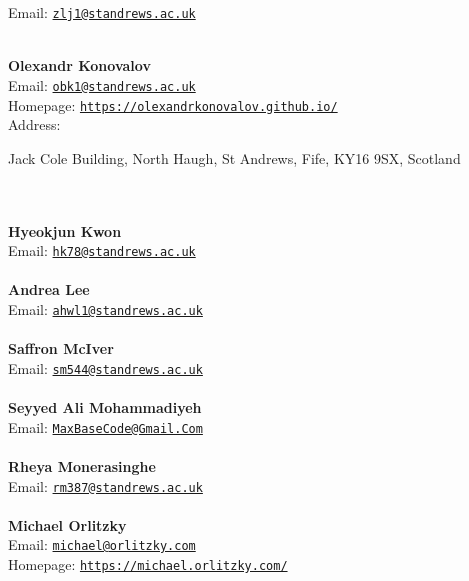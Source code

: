\documentclass[a4paper,11pt]{report}
\begin{document}
\begin{titlepage}
{{  }  Email: \href{mailto://zlj1@st-andrews.ac.uk} {\texttt{zlj1@st\texttt{}andrews.ac.uk}}}\\
{\mbox{}\\
\small \noindent \textbf{ Olexandr Konovalov\\
    }  Email: \href{mailto://obk1@st-andrews.ac.uk} {\texttt{obk1@st\texttt{}andrews.ac.uk}}\\
  Homepage: \href{https://olexandr-konovalov.github.io/} {\texttt{https://olexandr\texttt{}konovalov.github.io/}}\\
  Address: \begin{minipage}[t]{8cm}\noindent
 Jack Cole Building, North Haugh, St Andrews, Fife, KY16 9SX, Scotland\\
 \end{minipage}
}\\
{\mbox{}\\
\small \noindent \textbf{ Hyeokjun Kwon\\
  }  Email: \href{mailto://hk78@st-andrews.ac.uk} {\texttt{hk78@st\texttt{}andrews.ac.uk}}}\\
{\mbox{}\\
\small \noindent \textbf{ Andrea Lee\\
  }  Email: \href{mailto://ahwl1@st-andrews.ac.uk} {\texttt{ahwl1@st\texttt{}andrews.ac.uk}}}\\
{\mbox{}\\
\small \noindent \textbf{ Saffron McIver\\
  }  Email: \href{mailto://sm544@st-andrews.ac.uk} {\texttt{sm544@st\texttt{}andrews.ac.uk}}}\\
{\mbox{}\\
\small \noindent \textbf{ Seyyed Ali Mohammadiyeh\\
  }  Email: \href{mailto://MaxBaseCode@Gmail.Com} {\texttt{MaxBaseCode@Gmail.Com}}}\\
{\mbox{}\\
\small \noindent \textbf{ Rheya Monerasinghe\\
  }  Email: \href{mailto://rm387@st-andrews.ac.uk} {\texttt{rm387@st\texttt{}andrews.ac.uk}}}\\
{\mbox{}\\
\small \noindent \textbf{ Michael Orlitzky\\
   }  Email: \href{mailto://michael@orlitzky.com} {\texttt{michael@orlitzky.com}}\\
  Homepage: \href{https://michael.orlitzky.com/} {\texttt{https://michael.orlitzky.com/}}}\\

\end{titlepage}
\end{document}

